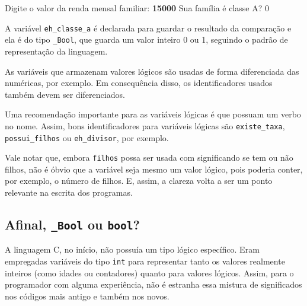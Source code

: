 \documentclass[
  11pt,
  a4paper,
]{scrbook}
\newenvironment{Shaded}{\begin{snugshade}}{\end{snugshade}}
\newcommand{\KeywordTok}[1]{\textcolor[rgb]{0.13,0.29,0.53}{\textbf{#1}}}
\newcommand{\NormalTok}[1]{#1}
\begin{document}
\begin{Shaded}
\begin{Highlighting}[]
\NormalTok{Digite o valor da renda mensal familiar: }\KeywordTok{ 15000 }
\NormalTok{Sua família é classe A? 0}
\end{Highlighting}
\end{Shaded}

A variável \texttt{eh\_classe\_a} é declarada para guardar o resultado
da comparação e ela é do tipo \texttt{\_Bool}, que guarda um valor
inteiro 0 ou 1, seguindo o padrão de representação da linguagem.

\begin{tcolorbox}[enhanced jigsaw, arc=.35mm, bottomtitle=1mm, colbacktitle=quarto-callout-tip-color!10!white, title=\textcolor{quarto-callout-tip-color}{\faLightbulb}\hspace{0.5em}{Dica}, toprule=.15mm, left=2mm, opacityback=0, colback=white, colframe=quarto-callout-tip-color-frame, opacitybacktitle=0.6, bottomrule=.15mm, leftrule=.75mm, toptitle=1mm, coltitle=black, titlerule=0mm, rightrule=.15mm, breakable]

As variáveis que armazenam valores lógicos são usadas de forma
diferenciada das numéricas, por exemplo. Em consequência disso, os
identificadores usados também devem ser diferenciados.

Uma recomendação importante para as variáveis lógicas é que possuam um
verbo no nome. Assim, bons identificadores para variáveis lógicas são
\texttt{existe\_taxa}, \texttt{possui\_filhos} ou \texttt{eh\_divisor},
por exemplo.

Vale notar que, embora \texttt{filhos} possa ser usada com significando
se tem ou não filhos, não é óbvio que a variável seja mesmo um valor
lógico, pois poderia conter, por exemplo, o número de filhos. E, assim,
a clareza volta a ser um ponto relevante na escrita dos programas.

\end{tcolorbox}

\subsection{\texorpdfstring{Afinal, \texttt{\_Bool} ou
\texttt{bool}?}{Afinal, \_Bool ou bool?}}\label{afinal-_bool-ou-bool}

A linguagem C, no início, não possuía um tipo lógico específico. Eram
empregadas variáveis do tipo \texttt{int} para representar tanto os
valores realmente inteiros (como idades ou contadores) quanto para
valores lógicos. Assim, para o programador com alguma experiência, não é
estranha essa mistura de significados nos códigos mais antigo e também
nos novos.
\end{document}
